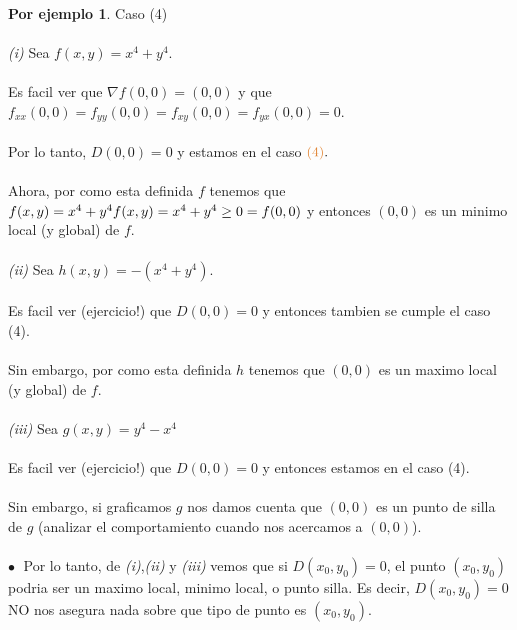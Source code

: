 \documentclass{article}
\theoremstyle{definition}
\theoremstyle{definition}
\newtheorem*{ej}{Por ejemplo}
\theoremstyle{remark}
\newcommand\bl{$\bullet\;$}
\begin{document}
\begin{ej}
  Caso \textcolor{rojop2}{(4)} \\\\
  \textcolor{verdep2}{\emph{(i)\phantom{ii}}} Sea $f(x,y)=x^4+y^4$.\\\\ Es facil ver que $\nabla f (0,0)=(0,0)$ y que \mbox{$f_{xx}(0,0)=f_{yy}(0,0)=f_{xy}(0,0)=f_{yx}(0,0)=0$}.\\\\ Por lo tanto, $D(0,0)=0$ y estamos en el caso $\textcolor{rojop2}{(4)}.$\\\\ Ahora, por como esta definida $f$ tenemos que $f(x,y)=x^4+y^4 \\\\ f(x,y)=x^4+y^4 \geq 0 =f(0,0)$ y entonces $(0,0)$ es un minimo local (y global) de $f$. \\\\
  \textcolor{verdep2}{\emph{(ii)\phantom{i}}} Sea $h(x,y)=-(x^4+y^4)$. \\\\ Es facil ver (ejercicio!) que $D(0,0)=0$ y entonces tambien se cumple el caso \textcolor{rojop2}{(4)}.\\\\Sin embargo, por como esta definida $h$ tenemos que $(0,0)$ es un maximo local (y global) de $f$.\\\\
  \textcolor{verdep2}{\emph{(iii)}} Sea $g(x,y)=y^4-x^4$ \\\\
  Es facil ver (ejercicio!) que $D(0,0)=0$ y entonces estamos en el caso \textcolor{rojop2}{(4)}. \\\\Sin embargo, si graficamos $g$ nos damos cuenta que $(0,0)$ es un punto de silla de $g$ \big(analizar el comportamiento cuando nos acercamos a $(0,0)$\big). \\\\
  \textcolor{azulp2}{\bl} Por lo tanto, de \textcolor{verdep2}{\emph{(i)}},\textcolor{verdep2}{\emph{(ii)}} y \textcolor{verdep2}{\emph{(iii)}} vemos que si $D(x_0,y_0)=0$, el punto $(x_0,y_0)$ podria ser un maximo local, minimo local, o punto silla. Es decir, $D(x_0,y_0)=0$ NO nos asegura nada sobre que tipo de punto es $(x_0,y_0)$.
\end{ej}
\end{document}
